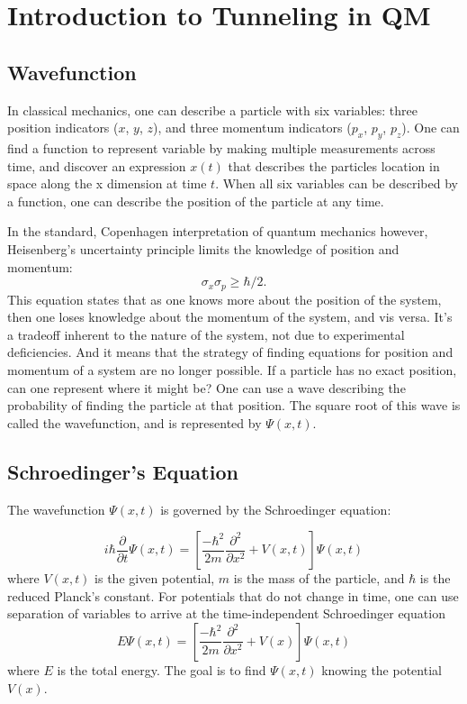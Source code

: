 \chapter{Introduction to Tunneling in QM}	


\section{Wavefunction}	
In classical mechanics, one can describe a particle with six variables: three position indicators ($x$, $y$, $z$), and three momentum indicators ($p_x$, $p_y$, $p_z$). One can find a function to represent variable by making multiple measurements across time, and discover an expression $x(t)$ that describes the particles location in space along the x dimension at time $t$. When all six variables can be described by a function, one can describe the position of the particle at any time.  

In the standard, Copenhagen interpretation of quantum mechanics however, Heisenberg's uncertainty principle limits the knowledge of position and momentum: 
$$\sigma_{x} \sigma_{p} \geq \hbar/2. $$
This equation states that as one knows more about the position of the system, then one loses knowledge about the momentum of the system, and vis versa. It's a tradeoff inherent to the nature of the system, not due to experimental deficiencies. And it means that the strategy of finding equations for position and momentum of a system are no longer possible. If a particle has no exact position, can one represent where it might be? One can use a wave describing the probability of finding the particle at that position. The square root of this wave is called the wavefunction, and is represented by $\Psi(x, t)$.


\section{Schroedinger's Equation}

The wavefunction $\Psi(x, t)$ is governed by the Schroedinger equation:

$$i\hbar\frac{\partial}{\partial t} \Psi(x,t) = \left [ \frac{-\hbar^2}{2m}\frac{\partial^2}{\partial x^2} + V(x,t)\right ] \Psi(x,t) $$
where $V(x,t)$ is the given potential, $m$ is the mass of the particle, and $\hbar$ is the reduced Planck's constant. For potentials that do not change in time, one can use separation of variables to arrive at the time-independent Schroedinger equation
$$E \Psi(x,t) = \left [ \frac{-\hbar^2}{2m}\frac{\partial^2}{\partial x^2} + V(x)\right ] \Psi(x,t)$$
where $E$ is the total energy. The goal is to find $\Psi(x,t)$ knowing the potential $V(x)$.




